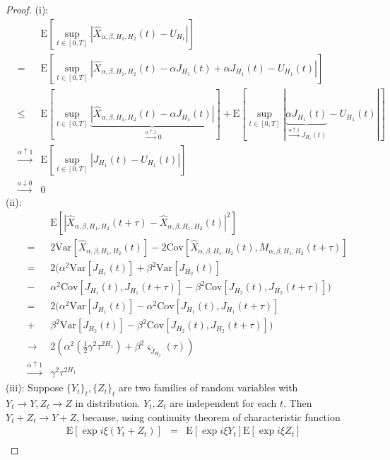 \documentclass[a4paper, twoside, 11pt]{article}
\theoremstyle{definition}
\begin{document}
  \begin{proof}
(i): 
\begin{eqnarray*}
  &&\mathrm{E}[\sup\limits_{t\in[0,T]}|\hat{X}_{\alpha,\beta,H_1,H_2}(t) - U_{H_1}|]\\
  &=&\mathrm{E} [\sup\limits_{t\in[0,T]}|\hat{X}_{\alpha,\beta,H_1,H_2}(t) - \alpha J_{H_1}(t) + \alpha J_{H_1}(t) - U_{H_1}(t)|]\\
  &\le&\mathrm{E} [\sup\limits_{t\in[0,T]}\underbrace{|\hat{X}_{\alpha,\beta,H_1,H_2}(t) - \alpha J_{H_1}(t)|}_{\overset{\alpha\uparrow 1}{\rightarrow}0 }] + \mathrm{E} [\sup\limits_{t\in[0,T]}|\underbrace{\alpha J_{H_1}(t)}_{\overset{\alpha\uparrow 1}{\rightarrow} J_{H_1}(t)} - U_{H_1}(t)|]\\ 
  &\overset{\alpha\uparrow 1}{\rightarrow}&  \mathrm{E} [\sup\limits_{t\in[0,T]}|J_{H_1}(t) - U_{H_1}(t)|]\\
	&\overset{a\downarrow 0}{\rightarrow}& 0
\end{eqnarray*}
(ii):
\begin{eqnarray*}
  && \mathrm{E}[|\hat{X}_{\alpha, \beta, H_1, H_2}(t+\tau) - \hat{X}_{\alpha, \beta, H_1, H_2}(t)|^2]\\
  &=& 2\mathrm{Var}[\hat{X}_{\alpha, \beta, H_1, H_2}(t)] - 2\mathrm{Cov}[\hat{X}_{\alpha, \beta, H_1, H_2}(t), M_{\alpha, \beta, H_1, H_2}(t+\tau)]\\
	&=& 2(\alpha^2\mathrm{Var}[J_{H_1}(t)] + \beta^2\mathrm{Var}[J_{H_2}(t)]  \\
	&-& \alpha^2\mathrm{Cov}[J_{H_1}(t), J_{H_1}(t+\tau)] - \beta^2\mathrm{Cov}[J_{H_2}(t), J_{H_2}(t+\tau)])\\
    &=&  2(\alpha^2\mathrm{Var}[J_{H_1}(t)] - \alpha^2\mathrm{Cov}[J_{H_1}(t), J_{H_1}(t+\tau)] \\
	&+& \beta^2\mathrm{Var}[J_{H_2}(t)] - \beta^2\mathrm{Cov}[J_{H_2}(t), J_{H_2}(t+\tau)])\\
	&\rightarrow& 2 (\alpha^2(\frac{1}{2}\gamma^2 \tau^{2H_1}) + \beta^2\varsigma_{\hat{J}_{H_2}}(\tau)) \\
	&\overset{\alpha\uparrow 1}{\rightarrow}& \gamma^2\tau^{2H_1}
\end{eqnarray*}
(iii): Suppose $\{Y_t\}_t, \{Z_t\}_t$ are two families of random variables with $Y_t \rightarrow Y, Z_t \rightarrow Z$ in distribution. $Y_t, Z_t$ are independent for each $t$. Then  $Y_t + Z_t \rightarrow Y+Z$, because, using continuity theorem of characteristic function
\begin{eqnarray*}
  \mathrm{E}[\exp{i\xi(Y_t+Z_t)}]&=& \mathrm{E}[\exp{i\xi Y_t}]\mathrm{E}[\exp{i\xi Z_t}]\\

\end{eqnarray*}
\end{proof}
\end{document}
